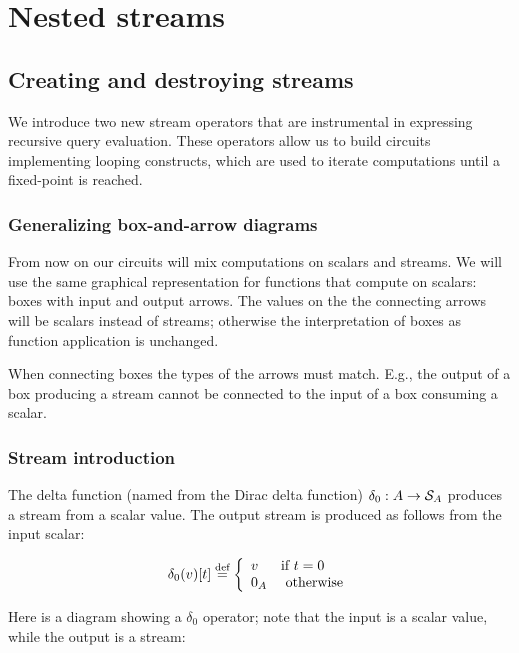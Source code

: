 \section{Nested streams}\label{sec:nested}

\subsection{Creating and destroying streams}\label{sec:stream-intro-elim}

We introduce two new stream operators that are instrumental in
expressing recursive query evaluation.  These operators allow us
to build circuits implementing looping constructs, which
are used to iterate computations until a fixed-point is reached.

\subsubsection{Generalizing box-and-arrow diagrams}

From now on our circuits will mix computations on scalars and streams.
We will use the same graphical representation for functions that compute
on scalars: boxes with input and output arrows.  The values on the
the connecting arrows will be scalars instead of streams; otherwise
the interpretation of boxes as function application is unchanged.

When connecting boxes the types of the arrows must match.  E.g.,
the output of a box producing a stream cannot be connected to the
input of a box consuming a scalar.

\subsubsection{Stream introduction}\label{sec:stream-introduction}

\begin{definition}
The delta function (named from the Dirac delta function) $\delta_0 : A \rightarrow \mathcal{S}_{A}$
produces a stream from a scalar value.
The output stream is produced as follows from the input scalar:

$$\delta_0(v)[t] \stackrel{\textrm{\scriptsize def}}{=} \left\{
\begin{array}{ll}
  v & \mbox{if } t = 0 \\
  0_A & \mbox{ otherwise}
\end{array}
\right.
$$
\end{definition}

Here is a diagram showing a $\delta_0$ operator; note that the input is a scalar value,
while the output is a stream:


